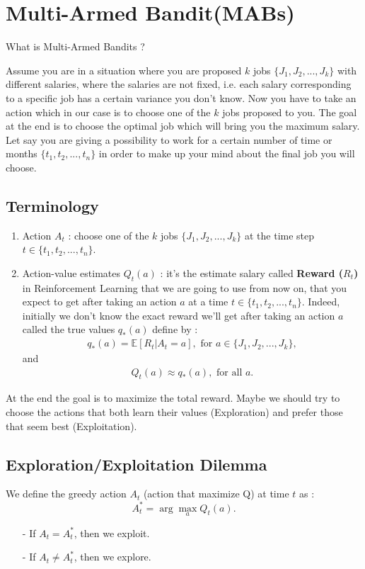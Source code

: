\documentclass[12pt,a4paper]{report}
\author{Abdel Mfougouon Njupoun}
\begin{document}
	\section*{Multi-Armed Bandit(MABs)}
	What is Multi-Armed Bandits ?
	
	Assume you are in a situation where you are proposed $k$ jobs $\{J_1, J_2,...,J_k\}$ with different salaries, where the salaries are not fixed, i.e. each salary corresponding to a specific job has a certain variance you don't know. Now you have to take an action which in our case is to choose one of the $k$ jobs proposed to you. The goal at the end is to choose the optimal job which will bring you the maximum salary. Let say you are giving a possibility to work for a certain number of time or months $\{t_1, t_2,..., t_n\}$ in order to make up your mind about the final job you will choose.
	
	\subsection*{Terminology}
	\begin{enumerate}
		\item Action $A_t$ : choose one of the $k$ jobs $\{J_1, J_2,...,J_k\}$ at the time step $t \in \{t_1, t_2,..., t_n\}$.
		\item Action-value estimates $Q_t(a)$ : it's the estimate salary called \textbf{Reward ($R_t$)} in Reinforcement Learning that we are going to use from now on, that you expect to get after taking an action $a$ at a time $t \in \{t_1, t_2,..., t_n\}$. Indeed, initially we don't know the exact reward we'll get after taking an action $a$ called the true values $q_{*}(a)$ define by :
		\begin{align*}
			q_{*}(a) = \mathbb{E} [R_t | A_t=a], \text{ for } a \in \{J_1, J_2,...,J_k\},
		\end{align*}
		and 
		\begin{align*}
			Q_t(a) \approx q_{*}(a), \text{ for all } a.
		\end{align*}
		\end{enumerate}
	At the end the goal is to maximize the total reward. Maybe we should try to choose the actions that both learn their values (Exploration) and prefer those that seem best (Exploitation).
	
	\subsection*{Exploration/Exploitation Dilemma}
	We define the greedy action $A_t$ (action that maximize Q) at time $t$ as :
	$$A^{*}_{t} = \arg\max_{a} Q_t(a).$$
	\begin{enumerate}
		\item[-] If $A_t = A^{*}_{t}$, then we exploit.
		\item[-] If $A_t \neq A^{*}_{t}$, then we explore.
	\end{enumerate}
	
\end{document}
